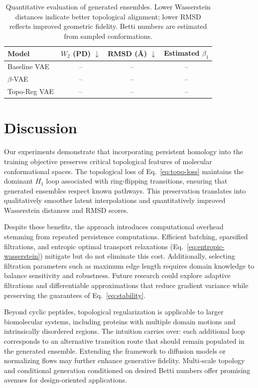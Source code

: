 \documentclass[11pt]{article}
\theoremstyle{definition}
\begin{document}
\begin{table}[t]
    \centering
    \caption{Quantitative evaluation of generated ensembles. Lower Wasserstein distances indicate better topological alignment; lower RMSD reflects improved geometric fidelity. Betti numbers are estimated from sampled conformations.}
    \label{tab:results}
    \begin{tabular}{lccc}
        \toprule
        Model & $W_2$ (PD) $\downarrow$ & RMSD (\AA) $\downarrow$ & Estimated $\beta_1$ \\
        \midrule
        Baseline VAE & -- & -- & -- \\
        $\beta$-VAE & -- & -- & -- \\
        Topo-Reg VAE & -- & -- & -- \\
        \bottomrule
    \end{tabular}
\end{table}

\section{Discussion}
Our experiments demonstrate that incorporating persistent homology into the training objective preserves critical topological features of molecular conformational spaces. The topological loss of Eq.~\eqref{eq:topo-loss} maintains the dominant $H_1$ loop associated with ring-flipping transitions, ensuring that generated ensembles respect known pathways. This preservation translates into qualitatively smoother latent interpolations and quantitatively improved Wasserstein distances and RMSD scores.

Despite these benefits, the approach introduces computational overhead stemming from repeated persistence computations. Efficient batching, sparsified filtrations, and entropic optimal transport relaxations (Eq.~\eqref{eq:entropic-wasserstein}) mitigate but do not eliminate this cost. Additionally, selecting filtration parameters such as maximum edge length requires domain knowledge to balance sensitivity and robustness. Future research could explore adaptive filtrations and differentiable approximations that reduce gradient variance while preserving the guarantees of Eq.~\eqref{eq:stability}.

Beyond cyclic peptides, topological regularization is applicable to larger biomolecular systems, including proteins with multiple domain motions and intrinsically disordered regions. The intuition carries over: each additional loop corresponds to an alternative transition route that should remain populated in the generated ensemble. Extending the framework to diffusion models or normalizing flows may further enhance generative fidelity. Multi-scale topology and conditional generation conditioned on desired Betti numbers offer promising avenues for design-oriented applications.
\end{document}

